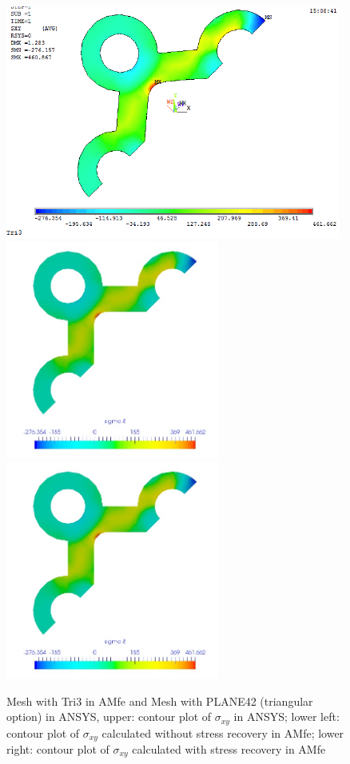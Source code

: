 \begin{figure}[htbp]
	\begin{center}
		\includegraphics[width=11cm,clip]{TTri3_Sxy.png} 	
		\includegraphics[width=7cm,clip]{TTri3_Sxy_PD.png} 		
		\includegraphics[width=7cm,clip]{TTri3_Sxy_P.png} 		
		\caption{Mesh with Tri3 in AMfe and Mesh with PLANE42 (triangular option) in ANSYS, upper: contour plot of $\sigma_{xy}$ in ANSYS; lower left: contour plot of $\sigma_{xy}$ calculated without stress recovery in AMfe; lower right: contour plot of $\sigma_{xy}$ calculated with stress recovery in AMfe} \label{fig: Tri3_Sxy}
	\end{center}
\end{figure}
\clearpage 

